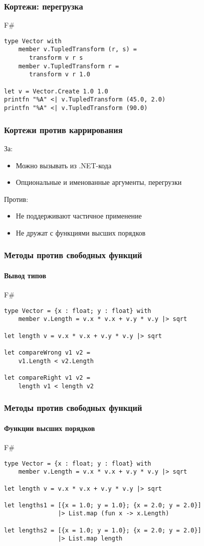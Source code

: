 \documentclass[xetex,mathserif,serif]{beamer}
\begin{document}
	\begin{frame}[fragile]
		\frametitle{Кортежи: перегрузка}
		\begin{exampleblock}{F\#}
			\begin{lstlisting}
type Vector with
    member v.TupledTransform (r, s) = 
       transform v r s
    member v.TupledTransform r = 
       transform v r 1.0

let v = Vector.Create 1.0 1.0
printfn "%A" <| v.TupledTransform (45.0, 2.0)
printfn "%A" <| v.TupledTransform (90.0)
\end{lstlisting}
\end{exampleblock}
\end{frame}

	\begin{frame}
		\frametitle{Кортежи против каррирования}
		За:
		\begin{itemize}
    		\item Можно вызывать из .NET-кода
    		\item Опциональные и именованные аргументы, перегрузки
		\end{itemize}
		Против:
		\begin{itemize}
    		\item Не поддерживают частичное применение
    		\item Не дружат с функциями высших порядков
   		\end{itemize}
    \end{frame}

	\begin{frame}[fragile]
		\frametitle{Методы против свободных функций}
		\framesubtitle{Вывод типов}
		\begin{exampleblock}{F\#}
			\begin{lstlisting}
type Vector = {x : float; y : float} with
    member v.Length = v.x * v.x + v.y * v.y |> sqrt
   
let length v = v.x * v.x + v.y * v.y |> sqrt

let compareWrong v1 v2 =
    v1.Length < v2.Length

let compareRight v1 v2 =
    length v1 < length v2
\end{lstlisting}
\end{exampleblock}
\end{frame}

	\begin{frame}[fragile]
		\frametitle{Методы против свободных функций}
		\framesubtitle{Функции высших порядков}
		\begin{exampleblock}{F\#}
			\begin{lstlisting}
type Vector = {x : float; y : float} with
    member v.Length = v.x * v.x + v.y * v.y |> sqrt
   
let length v = v.x * v.x + v.y * v.y |> sqrt

let lengths1 = [{x = 1.0; y = 1.0}; {x = 2.0; y = 2.0}]
               |> List.map (fun x -> x.Length)

let lengths2 = [{x = 1.0; y = 1.0}; {x = 2.0; y = 2.0}]
               |> List.map length
\end{lstlisting}
\end{exampleblock}
\end{frame}
\end{document}
